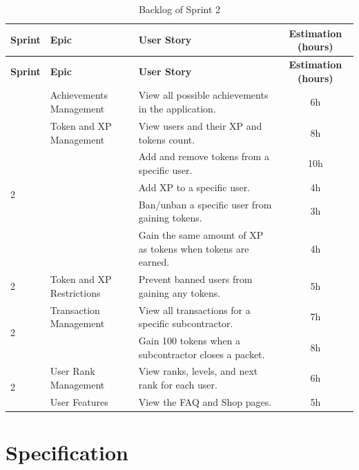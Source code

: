 \begin{longtable}{ | m{} | m{} | m{} | c | }
    \caption{Backlog of Sprint 2} \\
    \hline
    \rowcolor{primary} \textbf{Sprint} & \textbf{Epic} & \textbf{User Story} & \textbf{Estimation (hours)} \\
    \hline
    \endfirsthead
    \hline
    \textbf{Sprint} & \textbf{Epic} & \textbf{User Story} & \textbf{Estimation (hours)} \\
    \hline
    \endhead
    \hline
    \endfoot
    \endlastfoot
    2 & Achievements Management & View all possible achievements in the application. & 6h \\
    \hline
    \multirow{5}{*}{2} & Token and XP Management & View users and their XP and tokens count. & 8h \\
    \cline{3-4}
    & & Add and remove tokens from a specific user. & 10h \\
    \cline{3-4}
    & & Add XP to a specific user. & 4h \\
    \cline{3-4}
    & & Ban/unban a specific user from gaining tokens. & 3h \\
    \cline{3-4}
    & & Gain the same amount of XP as tokens when tokens are earned. & 4h \\
    \hline
    2 & Token and XP Restrictions & Prevent banned users from gaining any tokens. & 5h \\
    \hline
    \multirow{2}{*}{2} & Transaction Management & View all transactions for a specific subcontractor. & 7h \\
    \cline{3-4}
    & & Gain 100 tokens when a subcontractor closes a packet. & 8h \\
    \hline
    \multirow{2}{*}{2} & User Rank Management & View ranks, levels, and next rank for each user. & 6h \\
    \hline
    \multirow{2}{*}{2} & User Features & View the FAQ and Shop pages. & 5h \\
    \hline
\end{longtable}



\section{Specification}

